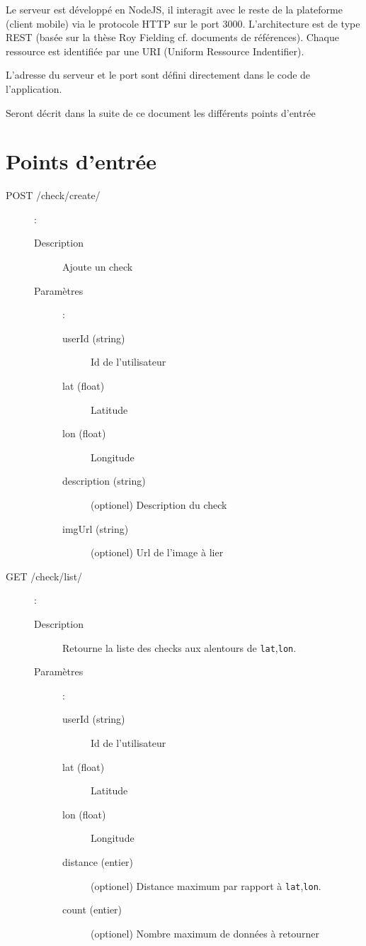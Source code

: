 \documentclass[a4paper,12pt]{report}
\begin{document}
\begin{onehalfspace}
Le serveur est développé en NodeJS, il interagit avec le reste de la plateforme (client mobile) via le protocole HTTP sur le port 3000. L'architecture est de type REST (basée sur la thèse Roy Fielding cf. documents de références). Chaque ressource est identifiée par une URI (Uniform Ressource Indentifier).

\newline
L'adresse du serveur et le port sont défini directement dans le code de l'application.

Seront décrit dans la suite de ce document les différents points d'entrée

\section{Points d'entrée}
\begin{description}
  \item[POST /check/create/]:

    \begin{description}
      \item[Description] Ajoute un check
      \item[Paramètres]:

        \begin{description}
          \item[userId (string)] Id de l'utilisateur
          \item[lat (float)] Latitude
          \item[lon (float)] Longitude
          \item[description (string)] (optionel) Description du check
          \item[imgUrl (string)] (optionel) Url de l'image à lier
        \end{description}
    \end{description}

  \item[GET /check/list/]:

    \begin{description}
      \item[Description] Retourne la liste des checks aux alentours de \lstinline{lat},\lstinline{lon}.

      \item[Paramètres]:
        \begin{description}
          \item[userId (string)] Id de l'utilisateur
          \item[lat (float)] Latitude
          \item[lon (float)] Longitude
          \item[distance (entier)] (optionel) Distance maximum par rapport à \lstinline{lat},\lstinline{lon}.
          \item[count (entier)] (optionel) Nombre maximum de données à retourner
        \end{description}
    \end{description}


\end{description}
\end{onehalfspace}
\end{document}
